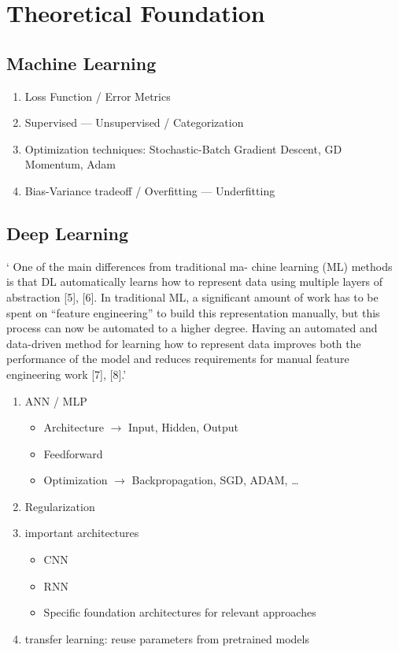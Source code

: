 \chapter{Theoretical Foundation}\label{ch:theoretical}

\section{Machine Learning}

\begin{enumerate}
    \item Loss Function / Error Metrics
    \item Supervised --- Unsupervised / Categorization
    \item Optimization techniques: Stochastic-Batch Gradient Descent, GD Momentum, Adam
    \item Bias-Variance tradeoff / Overfitting --- Underfitting
\end{enumerate}

\section{Deep Learning}
` One of the main differences from traditional ma- chine learning (ML) methods is that DL
automatically learns how to represent data using multiple layers of abstraction [5], [6].
In traditional ML, a significant amount of work has to be spent on “feature engineering” to
build this representation manually, but this process can now be automated to a higher degree.
Having an automated and data-driven method for learning how to represent data improves both the
performance of the model and reduces requirements for manual feature engineering work
[7], [8].'~\cite{arpteg_software_2018}

\begin{enumerate}
    \item ANN / MLP %
        \begin{itemize}
            \item Architecture $\rightarrow$ Input, Hidden, Output
            \item Feedforward
            \item Optimization $\rightarrow$ Backpropagation, SGD, ADAM, \ldots
        \end{itemize}
    \item Regularization
    \item important architectures
        \begin{itemize}
            \item CNN %
            \item RNN %
            \item Specific foundation architectures for relevant approaches
        \end{itemize}
    \item transfer learning: reuse parameters from pretrained models\\

\end{enumerate}

